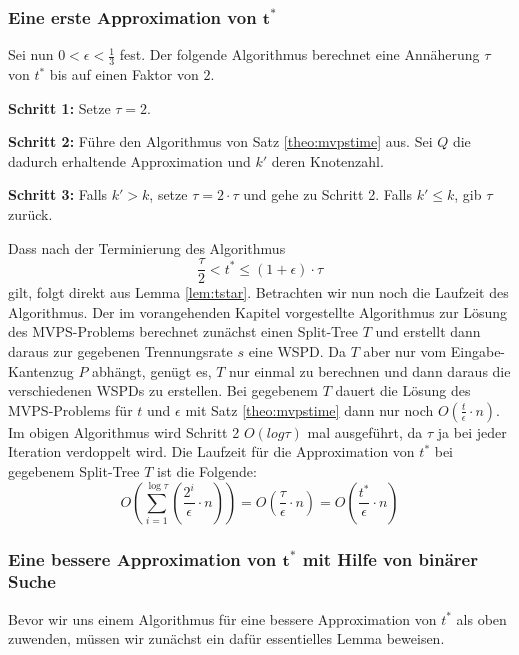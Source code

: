 \documentclass[11pt]{article}
\begin{document}
	\subsubsection*{Eine erste Approximation von $\mathbf{t^*}$}
	
	Sei nun $0 < \epsilon < \frac{1}{3}$ fest.
	Der folgende Algorithmus berechnet eine Annäherung $\tau$ von $t^*$ bis auf einen Faktor von $2$.
	\begin{description}
		\item{\textbf{Schritt 1:}} Setze $\tau = 2$.
		\item{\textbf{Schritt 2:}} Führe den Algorithmus von Satz \ref{theo:mvpstime} aus. Sei $Q$ die dadurch erhaltende Approximation und $k'$ deren Knotenzahl.
		\item{\textbf{Schritt 3:}} Falls $k' > k$, setze $\tau = 2 \cdot \tau$ und gehe zu Schritt 2.
		Falls $k' \leq k$, gib $\tau$ zurück.
	\end{description}
	
	Dass nach der Terminierung des Algorithmus 
	\[
		\label{eq:tau}
		\frac{\tau}{2} < t^* \leq (1 + \epsilon) \cdot \tau \tag{$\ast$}
	\]
	gilt, folgt direkt aus Lemma \ref{lem:tstar}. 
	Betrachten wir nun noch die Laufzeit des Algorithmus. 
	Der im vorangehenden Kapitel vorgestellte Algorithmus zur Lösung des MVPS-Problems berechnet zunächst einen Split-Tree $T$ und erstellt dann daraus zur gegebenen Trennungsrate $s$ eine WSPD. 
	Da $T$ aber nur vom Eingabe-Kantenzug $P$ abhängt, genügt es, $T$ nur einmal zu berechnen und dann daraus die verschiedenen WSPDs zu erstellen.
	Bei gegebenem $T$ dauert die Lösung des MVPS-Problems für $t$ und $\epsilon$ mit Satz \ref{theo:mvpstime} dann nur noch $O(\frac{t}{\epsilon}\cdot n)$.
	Im obigen Algorithmus wird Schritt 2 $O(log \tau)$ mal ausgeführt, da $\tau$ ja bei jeder Iteration verdoppelt wird.
	Die Laufzeit für die Approximation von $t^*$ bei gegebenem Split-Tree $T$ ist die Folgende:
	\[
	O(\sum_{i=1}^{\log \tau} (\frac{2^i}{\epsilon}\cdot n))
	= O(\frac{\tau}{\epsilon}\cdot n)
	= O(\frac{t^*}{\epsilon}\cdot n)
	\]
	
	\subsubsection*{Eine bessere Approximation von $\mathbf{t^*}$ mit Hilfe von binärer Suche}
	Bevor wir uns einem Algorithmus für eine bessere Approximation von $t^*$ als oben zuwenden, müssen wir zunächst ein dafür essentielles Lemma beweisen.
	
\end{document}
